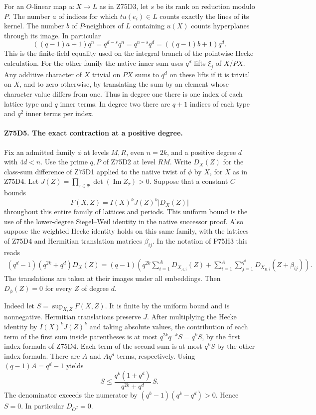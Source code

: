 For an $O$-linear map $u:X\to L$ as in Z75D3, let $s$ be its
rank on reduction modulo $P$. The number $a$ of indices for which
$t u(e_i)\in L$ counts exactly the lines of its kernel. The number
$b$ of $P$-neighbors of $L$ containing $u(X)$ counts hyperplanes
through its image. In particular
\[
 ((q-1)a+1)q^n=q^{d-s}q^n
               =q^{n-s}q^d=((q-1)b+1)q^d .
\]
This is the finite-field equality used on the integral branch of
the pointwise Hecke calculation. For the other family the native
inner sum uses $q^d$ lifts $\xi_j$ of $X/PX$. Any additive character
of $X$ trivial on $PX$ sums to $q^d$ on these lifts if it is trivial
on $X$, and to zero otherwise, by translating the sum by an element
whose character value differs from one.
Thus in degree one there is one index of each lattice type and $q$
inner terms. In degree two there are $q+1$ indices of each type
and $q^2$ inner terms per index.

\paragraph{Z75D5. The exact contraction at a positive degree.}
Fix an admitted family $\phi$ at levels $M,R$, even $n=2k$, and a
positive degree $d$ with $4d<n$. Use the prime $q,P$ of Z75D2 at
level $RM$. Write $D_X(Z)$ for the class-sum difference of Z75D1
applied to the native twist of $\phi$ by $X$, for $X$ as in Z75D4.
Let $J(Z)=\prod_{\tau\in\Psi}\det(\operatorname{Im}Z_\tau)>0$.
Suppose that a constant $C$ bounds
\[
 F(X,Z)=I(X)^k J(Z)^k |D_X(Z)|
\]
throughout this entire family of lattices and periods. This uniform
bound is the use of the lower-degree Siegel--Weil identity in the
native successor proof. Also suppose the weighted Hecke identity
holds on this same family, with the lattices of Z75D4 and Hermitian
translation matrices $\beta_{ij}$. In the notation of P75H3 this reads
\[
\begin{split}
 (q^d-1)(q^{2k}+q^d)D_X(Z)
   =(q-1)\left(q^{2k}\sum_{i=1}^{A}D_{X_{A,i}}(Z)
   +\sum_{i=1}^{A}\sum_{j=1}^{q^d}
           D_{X_{B,i}}(Z+\beta_{ij})\right).
\end{split}
\]
The translations are taken at their images under all embeddings.
Then $D_\phi(Z)=0$ for every $Z$ of degree $d$.

Indeed let $S=\sup_{X,Z}F(X,Z)$. It is finite by the uniform bound
and is nonnegative. Hermitian translations preserve $J$. After
multiplying the Hecke identity by $I(X)^kJ(Z)^k$ and taking
absolute values, the contribution of each term of the first sum
inside parentheses is at most $q^{2k}q^{-k}S=q^k S$, by the first
index formula of Z75D4. Each term of the second sum is at most
$q^k S$ by the other index formula. There are $A$ and $Aq^d$
terms, respectively. Using $(q-1)A=q^d-1$ yields
\[
 S\le\frac{q^k(1+q^d)}{q^{2k}+q^d}\,S.
\]
The denominator exceeds the numerator by
$(q^k-1)(q^k-q^d)>0$. Hence $S=0$. In particular $D_{O^d}=0$.

